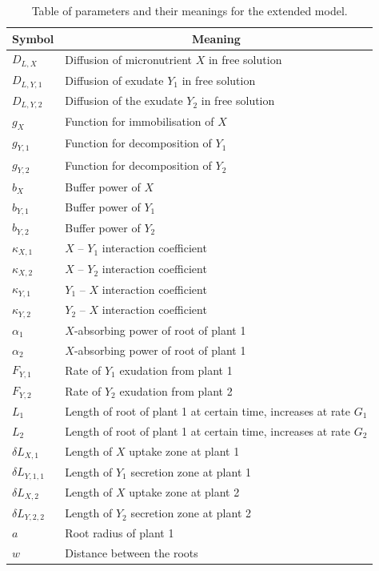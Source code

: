 \documentclass[11pt]{article}
\numberwithin{equation}{section}
\begin{document}
\begin{table}[!htb]
\begin{center}
\fontsize{9.5}{7}\selectfont
\setlength{\tabcolsep}{5.pt}
\def\arraystretch{1.5}
\begin{tabular}{ll}
\toprule
    \bf Symbol & \multicolumn{1}{c}{\bf Meaning}
    \\ \midrule
    $D_{L,X}$ & Diffusion of micronutrient $X$ in free solution \\  
	$D_{L,Y,1}$ &  Diffusion of exudate $Y_1$ in free solution \\   
	$D_{L,Y,2}$ & Diffusion of the exudate $Y_2$ in free solution \\
	$g_X$ & Function for immobilisation of $X$ \\
	$g_{Y,1}$ & Function for decomposition of $Y_1$ \\
	$g_{Y,2}$ & Function for decomposition of $Y_2$ \\
	$b_X$ & Buffer power of $X$ \\
	$b_{Y,1}$ & Buffer power of $Y_1$ \\
	$b_{Y,2}$ & Buffer power of $Y_2$ \\
	$\kappa_{X,1}$ & $X$ -- $Y_1$ interaction coefficient \\
	$\kappa_{X,2}$ & $X$ -- $Y_2$ interaction coefficient\\
	$\kappa_{Y,1}$ & $Y_1$ -- $X$ interaction coefficient\\
	$\kappa_{Y,2}$ & $Y_2$ -- $X$ interaction coefficient\\ 
	$\alpha_1 $ & $X$-absorbing power of root of plant 1 \\
	$\alpha_2 $ & $X$-absorbing power of root of plant 1 \\
	$F_{Y,1} $ & Rate of $Y_1$ exudation from plant 1 \\
	$F_{Y,2} $ & Rate of $Y_2$ exudation from plant 2 \\
	$L_1$ & Length of root of plant 1 at certain time, increases at rate $G_1$ \\
	$L_2$ & Length of root of plant 1 at certain time, increases at rate $G_2$ \\
	$\delta L_{X,1}$ & Length of $X$ uptake zone at plant 1 \\
	$\delta L_{Y,1,1}$ & Length of $Y_1$ secretion zone at plant 1  \\
	$\delta L_{X,2}$ & Length of $X$ uptake zone at plant 2 \\
	$\delta L_{Y,2,2}$ &  Length of $Y_2$ secretion zone at plant 2 \\
	$a$ & Root radius of plant 1 \\
	$w$ & Distance between the roots \\
\bottomrule
\end{tabular}
\caption{Table of parameters and their meanings for the extended model.
\label{t:Second-model-params}}
\end{center}
\end{table}
\end{document}
